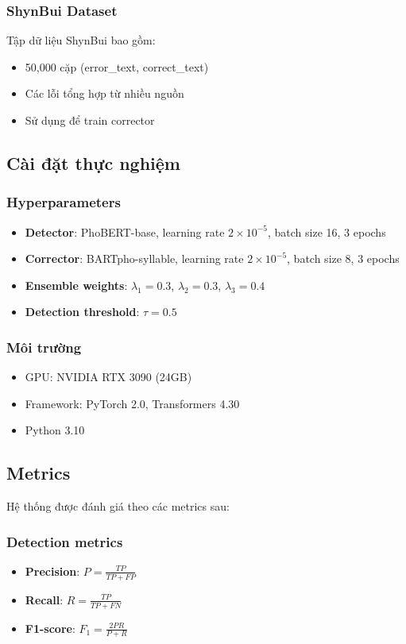 \documentclass[conference]{IEEEtran}
\begin{document}
\subsubsection{ShynBui Dataset}
Tập dữ liệu ShynBui \cite{shynbui2022} bao gồm:
\begin{itemize}
    \item 50,000 cặp (error\_text, correct\_text)
    \item Các lỗi tổng hợp từ nhiều nguồn
    \item Sử dụng để train corrector
\end{itemize}

\subsection{Cài đặt thực nghiệm}

\subsubsection{Hyperparameters}
\begin{itemize}
    \item \textbf{Detector}: PhoBERT-base, learning rate $2 \times 10^{-5}$, batch size 16, 3 epochs
    \item \textbf{Corrector}: BARTpho-syllable, learning rate $2 \times 10^{-5}$, batch size 8, 3 epochs
    \item \textbf{Ensemble weights}: $\lambda_1 = 0.3$, $\lambda_2 = 0.3$, $\lambda_3 = 0.4$
    \item \textbf{Detection threshold}: $\tau = 0.5$
\end{itemize}

\subsubsection{Môi trường}
\begin{itemize}
    \item GPU: NVIDIA RTX 3090 (24GB)
    \item Framework: PyTorch 2.0, Transformers 4.30
    \item Python 3.10
\end{itemize}

\subsection{Metrics}
Hệ thống được đánh giá theo các metrics sau:

\subsubsection{Detection metrics}
\begin{itemize}
    \item \textbf{Precision}: $P = \frac{TP}{TP + FP}$
    \item \textbf{Recall}: $R = \frac{TP}{TP + FN}$
    \item \textbf{F1-score}: $F_1 = \frac{2PR}{P + R}$
\end{itemize}
\end{document}
